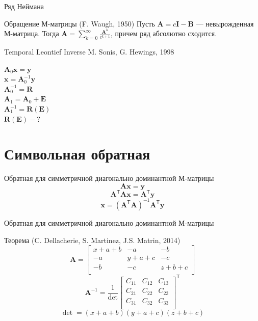 \documentclass[aspectratio=169]{beamer}
\begin{document}
\begin{frame}{Ряд Неймана}
\begin{block}{Обращение М-матрицы (F. Waugh, 1950)}
	Пусть $\mathbf{A} = c\mathbf{I} - \mathbf{B}$ --- невырожденная М-матрица. Тогда $\mathbf{A} = \sum_{k = 0}^{\infty} \frac{\mathbf{A}^k}{c^{k+1}}$, причем ряд абсолютно сходится.
\end{block}
\end{frame}

\begin{frame}{Temporal Leontief Inverse}
M. Sonis, G. Hewings, 1998

$\mathbf{A}_0 \mathbf{x} = \mathbf{y}$ \pause \\
$\mathbf{x} = \mathbf{A}_0^{-1} \mathbf{y}$ \pause \\
$\mathbf{A}_0^{-1} = \mathbf{R}$ \pause \\
$\mathbf{A}_1 = \mathbf{A}_0 + \mathbf{E}$ \pause \\
$\mathbf{A}_1^{-1} = \mathbf{R}(\mathbf{E})$ \pause \\
$\mathbf{R}(\mathbf{E}) - ?$
\end{frame}

\section{Символьная обратная}
\begin{frame}{Обратная для симметричной диагонально доминантной М-матрицы}
$$\mathbf{A}\mathbf{x} = \mathbf{y}$$ \pause
$$\mathbf{A}^{\mathsf{T}}\mathbf{A}\mathbf{x} = \mathbf{A}^{\mathsf{T}}\mathbf{y}$$ \pause
$$\mathbf{x} = (\mathbf{A}^{\mathsf{T}}\mathbf{A})^{-1}\mathbf{A}^{\mathsf{T}}\mathbf{y}$$
\end{frame}

\begin{frame}{Обратная для симметричной диагонально доминантной М-матрицы}
\begin{block}{Теорема (C. Dellacherie, S. Martinez, J.S. Matrin, 2014)}
		$$\mathbf{A} = \begin{bmatrix}
	x + a + b & -a & -b\\
	-a & y + a + c & -c\\
	-b & -c & z + b +c\\
	\end{bmatrix}$$
	$$\mathbf{A}^{-1} = \frac{1}{\operatorname{det}} \begin{bmatrix}
	C_{11} & C_{12} & C_{13}\\
	C_{21} & C_{22} & C_{23}\\
	C_{31} & C_{32} & C_{33}\\
	\end{bmatrix}^{\mathsf{T}}$$
	$$\operatorname{det} = (x + a + b)(y + a + c)(z + b + c)$$
\end{block}
\end{frame}
\end{document}
